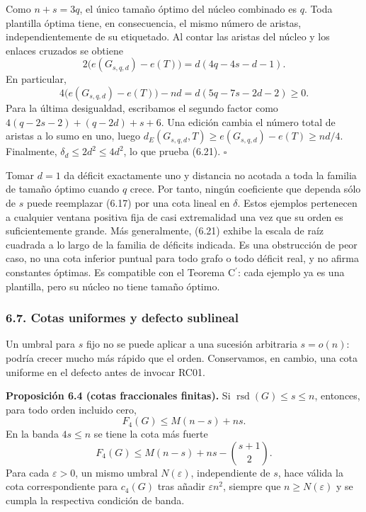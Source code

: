 \documentclass[spanish,11pt,a4paper]{article}
\begin{document}
Como \(n+s=3q\), el único tamaño óptimo del núcleo combinado es \(q\). Toda plantilla óptima tiene, en consecuencia, el mismo número de aristas, independientemente de su etiquetado. Al contar las aristas del núcleo y los enlaces cruzados se obtiene \[
2\bigl(e(G_{s,q,d})-e(T)\bigr)
=d(4q-4s-d-1).
\] En particular, \[
4\bigl(e(G_{s,q,d})-e(T)\bigr)-nd
=d(5q-7s-2d-2)\ge0.
\] Para la última desigualdad, escribamos el segundo factor como \(4(q-2s-2)+(q-2d)+s+6\). Una edición cambia el número total de aristas a lo sumo en uno, luego \(d_E(G_{s,q,d},T)\ge e(G_{s,q,d})-e(T)\ge nd/4\). Finalmente, \(\delta_d\le2d^2\le4d^2\), lo que prueba (6.21). \(\square\)

Tomar \(d=1\) da déficit exactamente uno y distancia no acotada a toda la familia de tamaño óptimo cuando \(q\) crece. Por tanto, ningún coeficiente que dependa sólo de \(s\) puede reemplazar (6.17) por una cota lineal en \(\delta\). Estos ejemplos pertenecen a cualquier ventana positiva fija de casi extremalidad una vez que su orden es suficientemente grande. Más generalmente, (6.21) exhibe la escala de raíz cuadrada a lo largo de la familia de déficits indicada. Es una obstrucción de peor caso, no una cota inferior puntual para todo grafo o todo déficit real, y no afirma constantes óptimas. Es compatible con el Teorema \texorpdfstring{C\ensuremath{^{\prime}}}{C'}: cada ejemplo ya es una plantilla, pero su núcleo no tiene tamaño óptimo.

\subsubsection{6.7. Cotas uniformes y defecto sublineal}\label{cotas-uniformes-y-defecto-sublineal}

Un umbral para \(s\) fijo no se puede aplicar a una sucesión arbitraria \(s=o(n)\): podría crecer mucho más rápido que el orden. Conservamos, en cambio, una cota uniforme en el defecto antes de invocar RC01.


\textbf{Proposición 6.4 (cotas fraccionales finitas).} Si \(\operatorname{rsd}(G)\le s\le n\), entonces, para todo orden incluido cero, \[
F_4(G)\le M(n-s)+ns.
\tag{6.22}
\] En la banda \(4s\le n\) se tiene la cota más fuerte \[
F_4(G)\le M(n-s)+ns-\binom{s+1}{2}.
\tag{6.23}
\] Para cada \(\varepsilon>0\), un mismo umbral \(N(\varepsilon)\), independiente de \(s\), hace válida la cota correspondiente para \(c_4(G)\) tras añadir \(\varepsilon n^2\), siempre que \(n\ge N(\varepsilon)\) y se cumpla la respectiva condición de banda.
\end{document}
